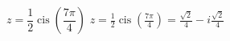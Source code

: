{ $z = \dfrac{1}{2}\operatorname{cis}\left(\dfrac{7\pi}{4}\right)$ }
{ $z = \frac{1}{2}\operatorname{cis}\left(\frac{7\pi}{4}\right) = \frac{\sqrt{2}}{4} - i\frac{\sqrt{2}}{4}$ }
